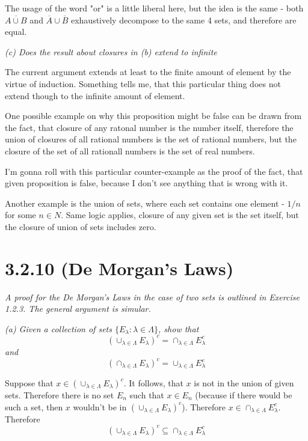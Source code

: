 \documentclass[11pt,oneside,titlepage]{book}
\begin{document}
The usage of the word "or" is a little liberal here, but the idea is the same - both
$\overline{A \cup B}$ and $\overline A \cup \overline B$ exhaustively decompose to the same
4 sets, and therefore are equal.

\textit{(c) Does the result about closures in (b) extend to infinite }

The current argument extends at least to the finite amount of element by the virtue of
induction. Something tells me, that this particular thing does not extend though to the
infinite amount of element.

One possible example on why this proposition might be false can be drawn
from the fact, that closure of any
ratonal number is the number itself, therefore the union of closures of all rational numbers is
the set of rational numbers, but the closure of the set of all rationall numbers is the
set of real numbers.

I'm gonna roll with this particular counter-example as the proof of the fact, that given
proposition is false, because I don't see anything that is wrong with it.

Another example  is the union of sets, where each set contains one element - $1/n$ for
some $n \in N$. Same logic applies, closure of any given set is the set itself, but
the closure of union of sets includes zero.


\section*{3.2.10 (De Morgan's Laws)}
\textit{A proof for the De Morgan's Laws in the case of two sets is outlined in Exercise 1.2.3.
  The general argument is simular.}

\textit{(a) Given a collection of sets $\{E_\lambda: \lambda \in  \Lambda\}$, show that }
$$\left(\cup_{\lambda \in \Lambda} E_\lambda \right)^c =
\cap_{\lambda \in \Lambda} E_\lambda^c$$
\textit{and}
$$\left(\cap_{\lambda \in \Lambda} E_\lambda \right)^c =
\cup_{\lambda \in \Lambda} E_\lambda^c$$

Suppose that $x \in \left(\cup_{\lambda \in \Lambda} E_\lambda \right)^c$. It
follows, that $x$ is not in the union of given sets. Therefore there is no
set $E_n$ such that $x \in E_n$ (because if there would be such a set, then $x$
wouldn't be in $\left(\cup_{\lambda \in \Lambda} E_\lambda \right)^c$).
Therefore $x \in \cap_{\lambda \in \Lambda} E_\lambda^c$. Therefore 
$$\left(\cup_{\lambda \in \Lambda} E_\lambda \right)^c \subseteq \cap_{\lambda \in \Lambda} E_\lambda^c$$
\end{document}
